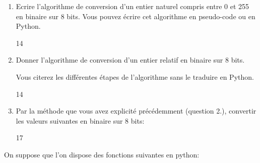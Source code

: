 \documentclass[a4paper,10pt]{report}
\def\ptsexoC{2}
\begin{document}
\begin{enumerate}
    \item Ecrire l'algorithme de conversion d'un entier naturel compris entre 0 et 255 en binaire sur 8 bits. Vous pouvez écrire cet algorithme en pseudo-code ou en Python.
    
    \begin{answer}{1}{4}\end{answer}

    \item Donner l'algorithme de conversion d'un entier relatif en binaire sur 8 bits.
    
    Vous citerez les différentes étapes de l'algorithme sans le traduire en Python.
    \begin{answer}{1}{4}\end{answer}

    \item Par la méthode que vous avez explicité précédemment (question 2.), convertir les valeurs suivantes en binaire sur 8 bits:
    
    \begin{answer}{1}{7}
    
        \begin{minipage}[t]{0.33\linewidth}
        \end{minipage}
        \begin{minipage}[t]{0.33\linewidth}
        \end{minipage}
        \begin{minipage}[t]{0.33\linewidth}
        \end{minipage}
    
    \end{answer}

\end{enumerate}

\newpage

\exods{\ptsexoC}

On suppose que l'on dispose des fonctions suivantes en python:
\end{document}
